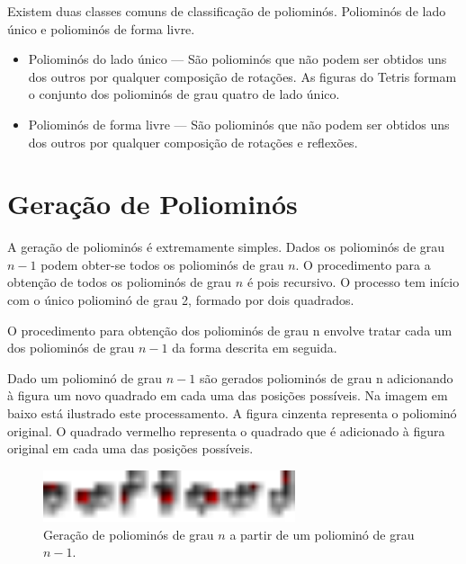 \documentclass[11pt]{article}
\begin{document}
Existem duas classes comuns de classificação de poliominós. Poliominós
de lado único e poliominós de forma livre.

\begin{itemize}

\item Poliominós do lado único --- São poliominós que não podem ser
  obtidos uns dos outros por qualquer composição de rotações. As
  figuras do Tetris formam o conjunto dos poliominós de grau quatro de
  lado único.

\item Poliominós de forma livre --- São poliominós que não podem ser
  obtidos uns dos outros por qualquer composição de rotações e
  reflexões.

\end{itemize}





\section{Geração de Poliominós}

A geração de poliominós é extremamente simples. Dados os poliominós de
grau $n-1$ podem obter-se todos os poliominós de grau $n$. O procedimento
para a obtenção de todos os poliominós de grau $n$ é pois recursivo. O
processo tem início com o único poliominó de grau 2, formado por dois
quadrados.

O procedimento para obtenção dos poliominós de grau n envolve tratar
cada um dos poliominós de grau $n-1$ da forma descrita em seguida.

Dado um poliominó de grau $n-1$ são gerados poliominós de grau n
adicionando à figura um novo quadrado em cada uma das posições
possíveis. Na imagem em baixo está ilustrado este processamento. A
figura cinzenta representa o poliominó original. O quadrado vermelho
representa o quadrado que é adicionado à figura original em cada uma
das posições possíveis.

\begin{figure}[H]
  \centering
  \includegraphics[width=0.66\textwidth]{../images/poliominos-step.pdf}
  \caption{Geração de poliominós de grau $n$ a partir de um poliominó
    de grau $n-1$.}
\end{figure}
\end{document}
